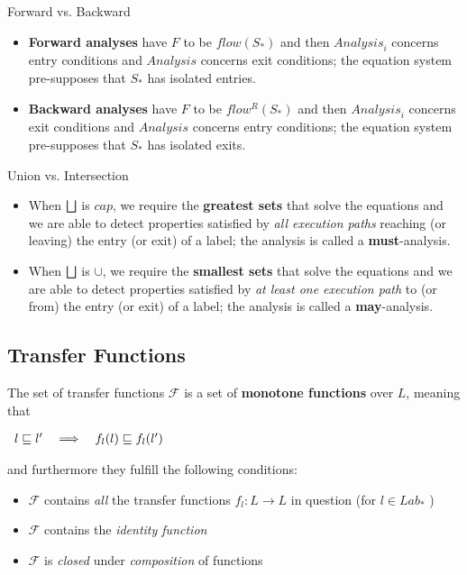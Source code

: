 Forward vs. Backward

\begin{itemize}
\item \textbf{Forward analyses} have $F$ to be $flow(S_*)$ and then
  $\mathit{Analysis}_i$ concerns entry conditions and
  $\mathit{Analysis}$ concerns exit conditions; the equation system
  pre-supposes that $S_*$ has isolated entries.
\item \textbf{Backward analyses} have $F$ to be $flow^R(S_*)$ and then
  $\mathit{Analysis}_i$ concerns exit conditions and
  $\mathit{Analysis}$ concerns entry conditions; the equation system
  pre-supposes that $S_*$ has isolated exits.
\end{itemize}


Union vs. Intersection

\begin{itemize}
\item When $\bigsqcup$ is $cap$, we require the \textbf{greatest sets}
  that solve the equations and we are able to detect properties
  satisfied by \textit{all execution paths} reaching (or leaving) the
  entry (or exit) of a label; the analysis is called a
  \textbf{must}-analysis.
\item When $\bigsqcup$ is $\cup$, we require the \textbf{smallest sets}
  that solve the equations and we are able to detect properties
  satisfied by \textit{at least one execution path} to (or from) the
  entry (or exit) of a label; the analysis is called a
  \textbf{may}-analysis.
\end{itemize}


\subsection{Transfer Functions}

The set of transfer functions $\mathcal{F}$ is a set of
\textbf{monotone functions} over $L$, meaning that

\begin{math}
  \begin{array}{lcl}
    l \sqsubseteq l' & \implies & f_l(l) \sqsubseteq f_l(l')
  \end{array}
\end{math}

and furthermore they fulfill the following conditions:

\begin{itemize}
\item $\mathcal{F}$ contains \textit{all} the transfer functions $f_l : L \to L $ in question (for $l \in Lab_* $ )
\item $\mathcal{F}$ contains the \textit{identity function}
\item $\mathcal{F}$ is \textit{closed} under \textit{composition} of
  functions
\end{itemize}



